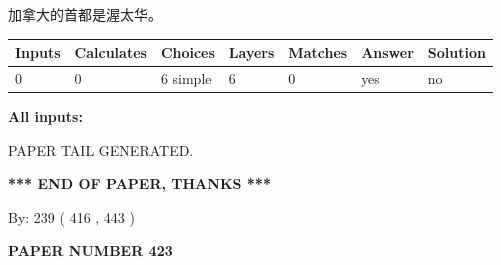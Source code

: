\documentclass{ctexart}
\begin{document}
 
加拿大的首都是渥太华。
 
 
\noindent{}
 
 
   
   
   
   
\noindent\begin{tabular}{|l|l|l|l|l|l|l|}
 \hline
Inputs & Calculates & Choices & Layers & Matches & Answer & Solution \\ \hline
 0  & 
 0  & 
 6
  simple  
  & 
 6  & 
 0  & 
  yes & 
  no 
  \\ \hline
 \end{tabular}
   
   
   
   
\noindent{}
   
   
   
   
\noindent\vspace{0.1in}\hspace{-0.08in} {\textbf{\Large{All inputs: }}}
   
   
   
   
   
   
 \vspace{0.2in}
 
   
   
\vspace{2.0in} PAPER TAIL GENERATED.
   
   
   
   
\vspace{1.0in} 
{\textbf{\large{ *** END OF PAPER, THANKS *** }}} 
   
   
\hspace{1.0in} By: 
 239 ( 416 ,  443 )
   
   
   
   
\newpage 
\setcounter{page}{ 
   423001 } 
   
   
   
   
 {\textbf{ \Large{ PAPER NUMBER  423  }}}
   
   
\vspace{0.2in}
   
   
   
   
   
   
   
\end{document}
